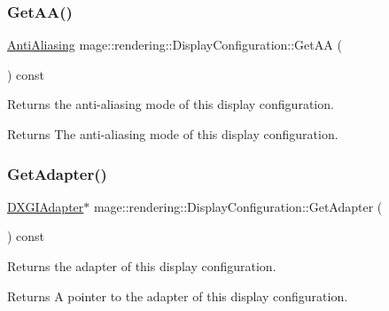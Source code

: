 \subsubsection{\texorpdfstring{Get\+A\+A()}{GetAA()}}
{\footnotesize\ttfamily \hyperlink{namespacemage_1_1rendering_ac3f75e49e92b42f2f5fb55c450d8899c}{Anti\+Aliasing} mage\+::rendering\+::\+Display\+Configuration\+::\+Get\+AA (\begin{DoxyParamCaption}{ }\end{DoxyParamCaption}) const\hspace{0.3cm}{\ttfamily [noexcept]}}

Returns the anti-\/aliasing mode of this display configuration.

\begin{DoxyReturn}{Returns}
The anti-\/aliasing mode of this display configuration. 
\end{DoxyReturn}
\hypertarget{classmage_1_1rendering_1_1_display_configuration_a8516379377ff3f6cec7b2d705398459f}{}\label{classmage_1_1rendering_1_1_display_configuration_a8516379377ff3f6cec7b2d705398459f} 
\subsubsection{\texorpdfstring{Get\+Adapter()}{GetAdapter()}}
{\footnotesize\ttfamily \hyperlink{namespacemage_1_1rendering_ad55e028ebd705b547eeb972ad8d03b6a}{D\+X\+G\+I\+Adapter}$\ast$ mage\+::rendering\+::\+Display\+Configuration\+::\+Get\+Adapter (\begin{DoxyParamCaption}{ }\end{DoxyParamCaption}) const\hspace{0.3cm}{\ttfamily [noexcept]}}

Returns the adapter of this display configuration.

\begin{DoxyReturn}{Returns}
A pointer to the adapter of this display configuration. 
\end{DoxyReturn}
\hypertarget{classmage_1_1rendering_1_1_display_configuration_a66c6757aa4c17227ab0e7022228f982a}{}\label{classmage_1_1rendering_1_1_display_configuration_a66c6757aa4c17227ab0e7022228f982a} 
